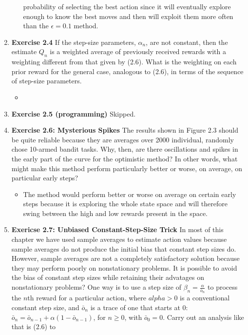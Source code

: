 \documentclass[12pt]{article}
\begin{document}
\begin{enumerate}[label=(\alph*)]
\begin{itemize}
    probability of selecting the best action since it will eventually explore enough to know the best moves and then will
    exploit them more often than the $\epsilon = 0.1$ method. 
  \end{itemize}
  \item \textbf{Exercise 2.4} If the step-size parameters, $\alpha_n$, are not constant, then the estimate $Q_n$ is a
  weighted average of previously received rewards with a weighting different from that given by (2.6). What is the
  weighting on each prior reward for the general case, analogous to (2.6), in terms of the sequence of step-size parameters.
  \begin{itemize}
    \item 
  \end{itemize}
  \item \textbf{Exercise 2.5 (programming)} Skipped.
  \item \textbf{Exercise 2.6: Mysterious Spikes} The results shown in Figure 2.3 should be quite reliable because they are
  averages over 2000 individual, randomly chose 10-armed bandit tasks. Why, then, are there oscillations and spikes in the early
  part of the curve for the optimistic method? In other words, what might make this method perform particularly better or worse,
  on average, on particular early steps?
  \begin{itemize}
    \item The method would perform better or worse on average on certain early steps because it is exploring the whole state space
    and will therefore swing between the high and low rewards present in the space.
  \end{itemize}
  \item \textbf{Exericse 2.7: Unbiased Constant-Step-Size Trick} In most of this chapter we have used sample averages to estimate action
  values because sample averages do not produce the initial bias that constant step sizes do. However, sample averages are not a completely
  satisfactory solution because they may perform poorly on nonstationary problems. It is possible to avoid the bias of constant step sizes
  while retaining their advatages on nonstationary problems? One way is to use a step size of $\beta_n = \frac{\alpha}{\bar{o}_n}$ to process 
  the $n$th reward for a particular action, where $alpha > 0$ is a conventional constant step size, and $\bar{o}_n$ is a trace of one that starts
  at 0: $\bar{o}_n = \bar{o}_{n-1} + \alpha(1 - \bar{o}_{n-1})$, for $n \ge 0$, with $\bar{o}_0 = 0$. Carry out an analysis like that is (2.6) to

\end{enumerate}
\end{document}
